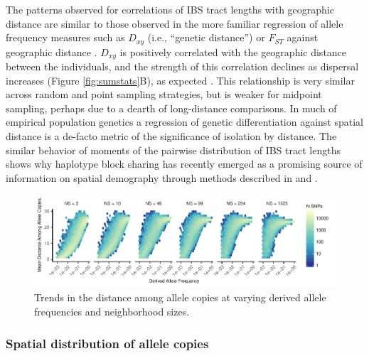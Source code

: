 \documentclass[10pt,twoside,lineno,hidelinks]{preprint}
\begin{document}
The patterns observed for correlations of IBS tract lengths with geographic distance are similar to those observed in the more familiar regression of allele frequency measures such as $D_{xy}$ (i.e., ``genetic distance'') or $F_{ST}$ against geographic distance \citep{Rousset1997}. $D_{xy}$ is positively correlated with the geographic distance between the individuals, and the strength of this correlation declines as dispersal increases (Figure \ref{fig:sumstats}B), as expected \citep{Wright1943,Rousset1997}. This relationship is very similar across random and point sampling strategies, but is weaker for midpoint sampling, perhaps due to a dearth of long-distance comparisons. In much of empirical population genetics a regression of genetic differentiation against spatial distance is a de-facto metric of the significance of isolation by distance. The similar behavior of moments of the pairwise distribution of IBS tract lengths shows why haplotype block sharing has recently emerged as a promising source of information on spatial demography through methods described in \citet{Ringbauer2017} and \citet{Baharian2016}. 

\begin{figure}[p]
\centering
\includegraphics[width=\textwidth]{figures/distance_by_DAF.pdf}
\caption{Trends in the distance among allele copies at varying derived allele frequencies and neighborhood sizes.}
\label{fig:dafdists}
\end{figure}

\subsubsection{Spatial distribution of allele copies}
\end{document}
